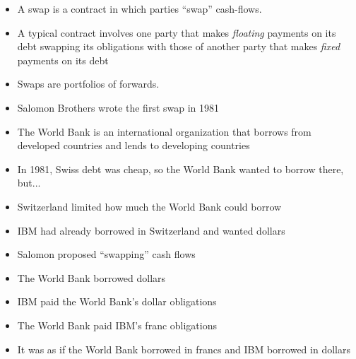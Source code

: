 \documentclass{beamer}
\begin{document}
\begin{frame}{}
	\begin{itemize}
		\item A swap is a contract in which parties ``swap'' cash-flows. 
		\item A typical contract involves one party that makes \textit{floating} payments on its debt swapping its obligations with those of another party that makes \textit{fixed} payments on its debt
		\item Swaps are portfolios of forwards. 
	\end{itemize}
\end{frame}

\begin{frame}{}
    \begin{itemize}
        \item Salomon Brothers wrote the first swap in 1981
        \item The World Bank is an international organization that borrows from developed countries and lends to developing countries
        \item In 1981, Swiss debt was cheap, so the World Bank wanted to borrow there, but...
        \item Switzerland limited how much the World Bank could borrow
        \item IBM had already borrowed in Switzerland and wanted dollars
        \item Salomon proposed ``swapping'' cash flows
        \item The World Bank borrowed dollars
        \item IBM paid the World Bank's dollar obligations
        \item The World Bank paid IBM's franc obligations
        \item It was as if the World Bank borrowed in francs and IBM borrowed in dollars
    \end{itemize}
\end{frame}
\end{document}
